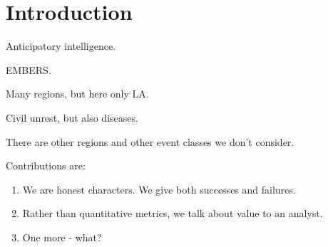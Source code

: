 \section{Introduction}
Anticipatory intelligence.

EMBERS.

Many regions, but here only LA.

Civil unrest, but also diseases.

There are other regions and other event classes we don't consider.

Contributions are:
\begin{enumerate}
\item We are honest characters. We give both successes and failures.
\item Rather than quantitative metrics, we talk about value to an analyst.
\item One more - what?
\end{enumerate}


